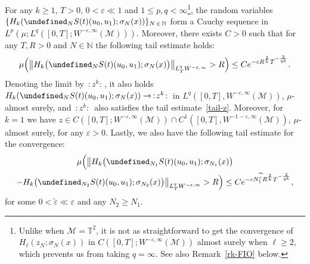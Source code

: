 \documentclass[AHL,Unicode,longabstracts,published]{cedram}
\newcommand{\T}{\mathbb{T}}
\newcommand{\N}{\mathbb{N}}
\let\P= \undefined
\newcommand{\P}{\mathbf{P}}
\newcommand{\M}{\mathcal{M}}
\newcommand{\eps}{\varepsilon}
\newcommand{\s}{\sigma}
\newcommand{\wt}{\widetilde}
\begin{document}
\begin{prop}\label{prop-z}
For any $k\geq 1$, $T>0$, $0<\eps \ll 1$ and $1\leq p,q<\infty$\footnote{Unlike when $\M=\T^2$, it is not as straightforward to get the convergence of $H_\ell(z_N;\s_N(x))$ in $C([0,T];W^{-\eps,\infty}(\M))$ almost surely when $\ell\ge 2$, which prevents us from taking $q=\infty$. See also Remark~\ref{rk-FIO} below.}, the random variables $\{H_k(\P_NS(t)(u_0,u_1);\s_N(x))\}_{N\,\in\,\N}$ form a Cauchy sequence in $L^p(\mu;L^q([0,T];W^{-\eps,\infty}(\M)))$. Moreover, there exists $C>0$ such that for any $T,R>0$ and $N\in\N$ the following tail estimate holds:
\begin{equation}\label{tail-z}
\mu\Big(\big\|H_k\big(\P_NS(t)(u_0,u_1);\s_N(x)\big)\big\|_{L^q_TW^{-\eps,\infty}}>R\Big)\leq Ce^{-cR^{\frac2k}T^{-\frac2{qk}}}.
\end{equation}
Denoting the limit by $\,:\!z^k\!:\,$, it also holds $H_k(\P_NS(t)(u_0,u_1);\s_N(x))\rightarrow \,:\!z^k\!:\,$ in $L^q([0,T],W^{-\eps,\infty}(\M))$, $\mu$-almost surely, and $\,:\!z^k\!:\,$ also satisfies the tail estimate~\eqref{tail-z}. Moreover, for $k=1$ we have $z\in C([0,T];W^{-\eps,\infty}(\M))\cap C^1([0,T],W^{-1-\eps,\infty}(\M)) $, $\mu$-almost surely, for any $\eps>0$. Lastly, we also have the following tail estimate for the convergence:
\begin{multline}\label{tail-z-zN}
\mu\Big(\big\|H_k\big(\P_{N_1}S(t)(u_0,u_1);\s_{N_1}(x)\big)\\
-H_k\big(\P_{N_2}S(t)(u_0,u_1);\s_{N_2}(x)\big)\big\|_{L^q_TW^{-\eps,\infty}}
>R\Big)\leq Ce^{-cN_1^{\widetilde{\eps}}R^{\frac2k}T^{-\frac2{qk}}},
\end{multline}
for some $0<\wt\eps\ll\eps$ and any $N_2\ge N_1$.
\end{prop}
\end{document}
